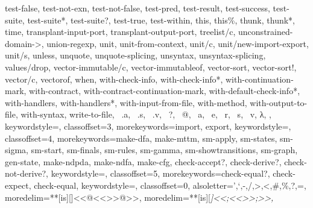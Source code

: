 {{test-false, test-not-exn, test-not-false, test-pred, test-result, test-success, test-suite, test-suite*, test-suite?, test-true, test-within, this, this\%, thunk, thunk*, time, transplant-input-port, transplant-output-port, treelist/c, unconstrained-domain->, union-regexp, unit, unit-from-context, unit/c, unit/new-import-export, unit/s, unless, unquote, unquote-splicing, unsyntax, unsyntax-splicing, values/drop, vector-immutable/c, vector-immutableof, vector-sort, vector-sort!, vector/c, vectorof, when, with-check-info, with-check-info*, with-continuation-mark, with-contract, with-contract-continuation-mark, with-default-check-info*, with-handlers, with-handlers*, with-input-from-file, with-method, with-output-to-file, with-syntax, write-to-file, ~.a, ~.s, ~.v, ~?, ~@, ~a, ~e, ~r, ~s, ~v, λ,
		},
		keywordstyle=\color{blue},
		classoffset=3,
		morekeywords={import, export},
		keywordstyle=\color{green},
		classoffset=4,
		morekeywords={make-dfa, make-mttm, sm-apply, sm-states, sm-sigma, sm-start, sm-finals, sm-rules, sm-gamma, sm-showtransitions, sm-graph, gen-state, make-ndpda, make-ndfa, make-cfg, check-accept?, check-derive?, check-not-derive?},
		keywordstyle=\color{pakistangreen},
		classoffset=5,
		morekeywords={check-equal?, check-expect, check-equal},
		keywordstyle=\color{brown},
		classoffset=0,
		alsoletter={',`,-,/,>,<,\#,\%,?,=},
		moredelim=**[is][\color{lightgray}]{<<@<<}{>>@>>},
		moredelim=**[is][\itshape\color{OliveGreen}]{<<;<<}{>>;>>},
	}
